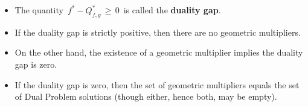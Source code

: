 \vskip 1.0cm
\begin{remark}
\mbox{}
\vskip 0.0cm
\begin{itemize}
\item
	The quantity \,$f^{*} - Q_{f,g}^{*}\,\geq\,0$\, is called the \textbf{duality gap}.
\item
	If the duality gap is strictly positive, then there are no geometric multipliers.
\item
	On the other hand, the existence of a geometric multiplier implies the duality gap is zero.
\item
	If the duality gap is zero, then the set of geometric multipliers equals the set of Dual Problem solutions
	(though either, hence both, may be empty).
\end{itemize}
\end{remark}


